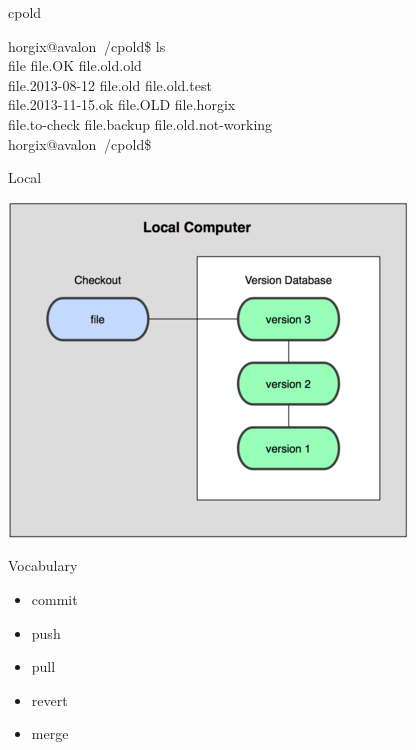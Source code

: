 \begin{frame}
\begin{center}{\large cpold}\end{center}
  horgix@avalon $~$/cpold\$ ls \\
  file                    file.OK             file.old.old \\
  file.2013-08-12         file.old            file.old.test \\
  file.2013-11-15.ok      file.OLD            file.horgix \\
  file.to-check           file.backup         file.old.not-working \\
  horgix@avalon $~$/cpold\$
\end{frame}
\begin{frame}
\begin{center}{\large Local}\end{center}

  \begin{center}
    \includegraphics[scale=0.5]{img/local.png}
  \end{center}

\end{frame}
\begin{frame}
\begin{center}{\large Vocabulary}\end{center}

  \begin{itemize}
    \item commit
    \item push
    \item pull
    \item revert
    \item merge
  \end{itemize}

\end{frame}

